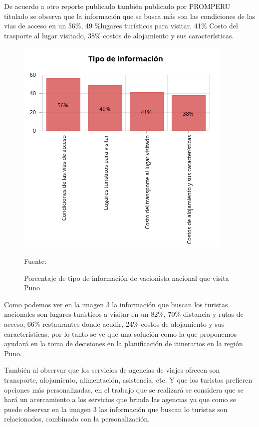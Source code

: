 De acuerdo a otro reporte publicado también publicado por PROMPERU titulado \cite{2017PerfilNacional} se observa que la información que se busca más son las condiciones de las vias de acceso en un 56\%, 49 \%lugares turísticos para visitar, 41\% Costo del trasporte al lugar visitado, 38\% costos de alojamiento y sus características. 

\begin{figure}[!ht]
    \centering
    \includegraphics[scale=0.7]{Capitulo2/Figs/tipo_informacion_nacional.jpg}
    \caption{Porcentaje de tipo de información de vacionista nacional que visita Puno}
    Fuente: 
    \label{fig:tipo_infomacion_nacional}
\end{figure}

Como podemos ver en la imagen 3 la información que buscan los turistas nacionales son lugares turísticos a visitar en un 82\%, 70\% distancia y rutas de acceso, 66\% restaurantes donde acudir, 24\% costos de alojamiento y sus características, por lo tanto se ve que una solución como la que proponemos ayudará en la toma de decisiones en la planificación de itinerarios en la región Puno.

También al observar que los servicios de agencias de viajes ofrecen son transporte, alojamiento, alimentación, asistencia, etc. Y que los turistas prefieren opciones más personalizadas, en el trabajo que se realizará se considera que se hará un acercamiento a los servicios que brinda las agencias ya que como se puede observar en la imagen 3 las información que buscan lo turistas son relacionados, combinado con la personalización.


